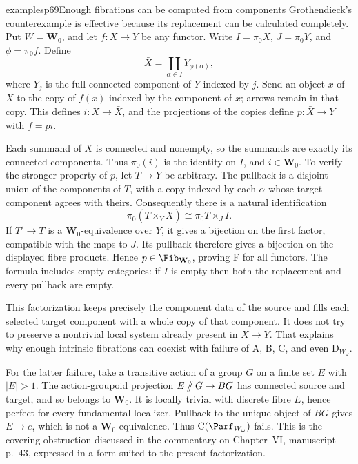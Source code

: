 \begin{dcomment}{examples}{p69}{Enough fibrations can be computed from components}
Grothendieck's counterexample is effective because its replacement can be calculated completely. Put $W=\mathbf W_0$, and let $f:X\to Y$ be any functor. Write $I=\pi_0X$, $J=\pi_0Y$, and $\phi=\pi_0f$. Define
\[
 \bar X=\coprod_{\alpha\in I}Y_{\phi(\alpha)},
\]
where $Y_j$ is the full connected component of $Y$ indexed by $j$. Send an object $x$ of $X$ to the copy of $f(x)$ indexed by the component of $x$; arrows remain in that copy. This defines $i:X\to\bar X$, and the projections of the copies define $p:\bar X\to Y$ with $f=pi$.

Each summand of $\bar X$ is connected and nonempty, so the summands are exactly its connected components. Thus $\pi_0(i)$ is the identity on $I$, and $i\in\mathbf W_0$. To verify the stronger property of $p$, let $T\to Y$ be arbitrary. The pullback is a disjoint union of the components of $T$, with a copy indexed by each $\alpha$ whose target component agrees with theirs. Consequently there is a natural identification
\[
 \pi_0(T\times_Y\bar X)
 \cong \pi_0T\times_J I.
\]
If $T'\to T$ is a $\mathbf W_0$-equivalence over $Y$, it gives a bijection on the first factor, compatible with the maps to $J$. Its pullback therefore gives a bijection on the displayed fibre products. Hence $p\in\Fib_{\mathbf W_0}$, proving F for all functors. The formula includes empty categories: if $I$ is empty then both the replacement and every pullback are empty.

This factorization keeps precisely the component data of the source and fills each selected target component with a whole copy of that component. It does not try to preserve a nontrivial local system already present in $X\to Y$. That explains why enough intrinsic fibrations can coexist with failure of A, B, C, and even $\mathrm D_{W_\omega}$.

For the latter failure, take a transitive action of a group $G$ on a finite set $E$ with $|E|>1$. The action-groupoid projection $E\mathbin{/\mkern-6mu/}G\to BG$ has connected source and target, and so belongs to $\mathbf W_0$. It is locally trivial with discrete fibre $E$, hence perfect for every fundamental localizer. Pullback to the unique object of $BG$ gives $E\to e$, which is not a $\mathbf W_0$-equivalence. Thus $\mathrm C(\Parf_{W_\omega})$ fails. This is the covering obstruction discussed in the commentary on Chapter~VI, manuscript p.~43, expressed in a form suited to the present factorization.
\end{dcomment}

